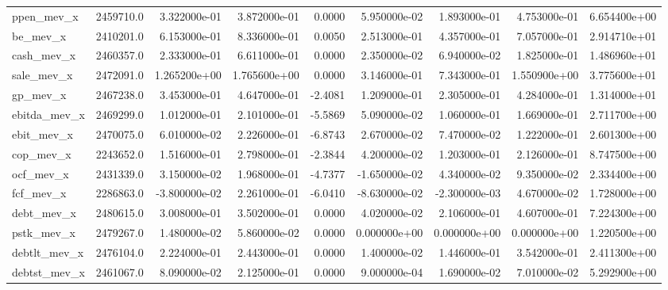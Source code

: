 \documentclass[10pt]{article}
\begin{document}
\begin{landscape}
\begin{longtable}{|l|r|r|r|r|r|r|r|r|}
ppen\_mev\_x              &  2459710.0 &  3.322000e-01 &  3.872000e-01 &      0.0000 &  5.950000e-02 &  1.893000e-01 &  4.753000e-01 &  6.654400e+00 \\
be\_mev\_x                &  2410201.0 &  6.153000e-01 &  8.336000e-01 &      0.0050 &  2.513000e-01 &  4.357000e-01 &  7.057000e-01 &  2.914710e+01 \\
cash\_mev\_x              &  2460357.0 &  2.333000e-01 &  6.611000e-01 &      0.0000 &  2.350000e-02 &  6.940000e-02 &  1.825000e-01 &  1.486960e+01 \\
sale\_mev\_x              &  2472091.0 &  1.265200e+00 &  1.765600e+00 &      0.0000 &  3.146000e-01 &  7.343000e-01 &  1.550900e+00 &  3.775600e+01 \\
gp\_mev\_x                &  2467238.0 &  3.453000e-01 &  4.647000e-01 &     -2.4081 &  1.209000e-01 &  2.305000e-01 &  4.284000e-01 &  1.314000e+01 \\
ebitda\_mev\_x            &  2469299.0 &  1.012000e-01 &  2.101000e-01 &     -5.5869 &  5.090000e-02 &  1.060000e-01 &  1.669000e-01 &  2.711700e+00 \\
ebit\_mev\_x              &  2470075.0 &  6.010000e-02 &  2.226000e-01 &     -6.8743 &  2.670000e-02 &  7.470000e-02 &  1.222000e-01 &  2.601300e+00 \\
cop\_mev\_x               &  2243652.0 &  1.516000e-01 &  2.798000e-01 &     -2.3844 &  4.200000e-02 &  1.203000e-01 &  2.126000e-01 &  8.747500e+00 \\
ocf\_mev\_x               &  2431339.0 &  3.150000e-02 &  1.968000e-01 &     -4.7377 & -1.650000e-02 &  4.340000e-02 &  9.350000e-02 &  2.334400e+00 \\
fcf\_mev\_x               &  2286863.0 & -3.800000e-02 &  2.261000e-01 &     -6.0410 & -8.630000e-02 & -2.300000e-03 &  4.670000e-02 &  1.728000e+00 \\
debt\_mev\_x              &  2480615.0 &  3.008000e-01 &  3.502000e-01 &      0.0000 &  4.020000e-02 &  2.106000e-01 &  4.607000e-01 &  7.224300e+00 \\
pstk\_mev\_x              &  2479267.0 &  1.480000e-02 &  5.860000e-02 &      0.0000 &  0.000000e+00 &  0.000000e+00 &  0.000000e+00 &  1.220500e+00 \\
debtlt\_mev\_x            &  2476104.0 &  2.224000e-01 &  2.443000e-01 &      0.0000 &  1.400000e-02 &  1.446000e-01 &  3.542000e-01 &  2.411300e+00 \\
debtst\_mev\_x            &  2461067.0 &  8.090000e-02 &  2.125000e-01 &      0.0000 &  9.000000e-04 &  1.690000e-02 &  7.010000e-02 &  5.292900e+00 \\

\end{longtable}
\end{landscape}
\end{document}
